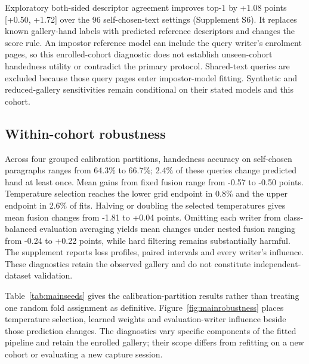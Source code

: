 \documentclass[ASNA,twocolumn]{USG}
\begin{document}
Exploratory both-sided descriptor agreement improves top-1 by +1.08 points [+0.50, +1.72] over the 96 self-chosen-text settings (Supplement S6). It replaces known gallery-hand labels with predicted reference descriptors and changes the score rule. An impostor reference model can include the query writer's enrolment pages, so this enrolled-cohort diagnostic does not establish unseen-cohort handedness utility or contradict the primary protocol. Shared-text queries are excluded because those query pages enter impostor-model fitting. Synthetic and reduced-gallery sensitivities remain conditional on their stated models and this cohort.

\subsection{Within-cohort robustness}
Across four grouped calibration partitions, handedness accuracy on self-chosen paragraphs ranges from 64.3\% to 66.7\%; 2.4\% of these queries change predicted hand at least once. Mean gains from fixed fusion range from -0.57 to -0.50 points. Temperature selection reaches the lower grid endpoint in 0.8\% and the upper endpoint in 2.6\% of fits. Halving or doubling the selected temperatures gives mean fusion changes from -1.81 to +0.04 points. Omitting each writer from class-balanced evaluation averaging yields mean changes under nested fusion ranging from -0.24 to +0.22 points, while hard filtering remains substantially harmful. The supplement reports loss profiles, paired intervals and every writer's influence. These diagnostics retain the observed gallery and do not constitute independent-dataset validation.

Table~\ref{tab:mainseeds} gives the calibration-partition results rather than treating one random fold assignment as definitive. Figure~\ref{fig:mainrobustness} places temperature selection, learned weights and evaluation-writer influence beside those prediction changes. The diagnostics vary specific components of the fitted pipeline and retain the enrolled gallery; their scope differs from refitting on a new cohort or evaluating a new capture session.
\end{document}
